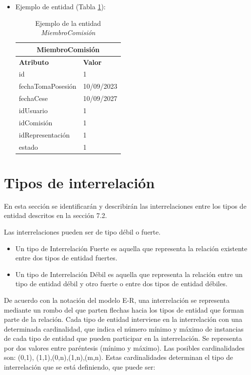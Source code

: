 \begin{itemize}
    \item Ejemplo de entidad (Tabla \ref{table:T-MiembroComisión}):

    \begin{table}[H]
    \centering
        \begin{tabular}{ |p{6cm}||p{6cm}|  }
             \hline
                \multicolumn{2}{|c|}{\textbf{MiembroComisión}} \\
             \hline
                 \textbf{Atributo} & \textbf{Valor} \\
             \hline
                 id & 1 \\
             \hline
                 fechaTomaPosesión & 10/09/2023 \\
             \hline
                 fechaCese & 10/09/2027 \\
             \hline
                 idUsuario & 1 \\
             \hline
                 idComisión & 1 \\
            \hline
                 idRepresentación & 1 \\
             \hline
                 estado & 1 \\
        \end{tabular}
        \caption{Ejemplo de la entidad \textit{MiembroComisión}}
        \label{table:T-MiembroComisión}
    \end{table}
\end{itemize}


\section{Tipos de interrelación} \label{sec:relaciones}
En esta sección se identificarán y describirán las interrelaciones entre los tipos de entidad descritos en la sección 7.2.

Las interrelaciones pueden ser de tipo débil o fuerte.

\begin{itemize}
    \item Un tipo de Interrelación Fuerte es aquella que representa la relación existente entre dos tipos de entidad fuertes.

    \item Un tipo de Interrelación Débil es aquella que representa la relación entre un tipo de entidad débil y otro fuerte o entre dos tipos de entidad débiles.
\end{itemize}

De acuerdo con la notación del modelo E-R, una interrelación se representa mediante un rombo del que parten flechas hacia los tipos de entidad que forman parte de la relación. Cada tipo de entidad interviene en la interrelación con una determinada cardinalidad, que indica el número mínimo y máximo de instancias de cada tipo de entidad que pueden participar en la interrelación. Se representa por dos valores entre paréntesis (mínimo y máximo). Las posibles cardinalidades son: (0,1), (1,1),(0,n),(1,n),(m,n). Estas cardinalidades determinan el tipo de interrelación que se está definiendo, que puede ser:


